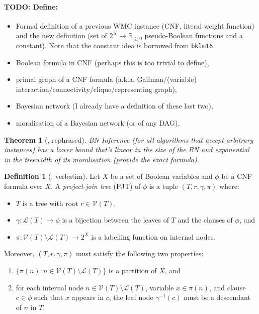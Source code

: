 \documentclass{article}
\newtheorem{theorem}{Theorem}
\theoremstyle{definition}
\newtheorem{definition}{Definition}
\theoremstyle{remark}
\begin{document}
\paragraph{TODO: Define:}
\begin{itemize}
\item Formal definition of a previous WMC instance (CNF, literal weight
  function) and the new definition (set of $2^{X} \to \mathbb{R}_{\ge 0}$
  pseudo-Boolean functions and a constant). Note that the constant idea is
  borrowed from \texttt{bklm16}.
\item Boolean formula in CNF (perhaps this is too trivial to define),
\item primal graph of a CNF formula (a.k.a.
  Gaifman/(variable) interaction/connectivity/clique/representing graph),
\item Bayesian network (I already have a definition of these last two),
\item moralisation of a Bayesian network (or of any DAG),
\end{itemize}

\begin{theorem}[\cite{DBLP:conf/ecai/KwisthoutBG10}, rephrased]
  BN Inference (for all algorithms that accept arbitrary instances) has a lower
  bound that's linear in the size of the BN and exponential in the treewidth of
  its moralisation (provide the exact formula).
\end{theorem}

\begin{definition}[\cite{DBLP:conf/cp/DudekPV20}, verbatim]
  Let $X$ be a set of Boolean variables and $\phi$ be a CNF formula over $X$. A
  \emph{project-join tree} (PJT) of $\phi$ is a tuple $(T, r, \gamma, \pi)$
  where:
  \begin{itemize}
  \item $T$ is a tree with root $r \in \mathcal{V}(T)$,
  \item $\gamma\colon \mathcal{L}(T) \to \phi$ is a bijection between the leaves
    of $T$ and the clauses of $\phi$, and
  \item $\pi\colon \mathcal{V}(T) \setminus \mathcal{L}(T) \to 2^X$ is a
    labelling function on internal nodes.
  \end{itemize}
  Moreover, $(T, r, \gamma, \pi)$ must satisfy the following two properties:
  \begin{enumerate}
  \item $\{\pi(n) : n \in \mathcal{V}(T) \setminus \mathcal{L}(T)\}$ is a
    partition of $X$, and
  \item for each internal node $n \in \mathcal{V}(T) \setminus \mathcal{L}(T)$,
    variable $x \in \pi(n)$, and clause $c \in \phi$ such that $x$ appears in
    $c$, the leaf node $\gamma^{-1}(c)$ must be a descendant of $n$ in $T$.
  \end{enumerate}
\end{definition}
\end{document}
